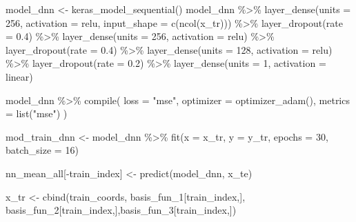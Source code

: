 \documentclass[
]{article}
\newenvironment{Shaded}{\begin{snugshade}}{\end{snugshade}}
\newcommand{\AttributeTok}[1]{\textcolor[rgb]{0.77,0.63,0.00}{#1}}
\newcommand{\DecValTok}[1]{\textcolor[rgb]{0.00,0.00,0.81}{#1}}
\newcommand{\FloatTok}[1]{\textcolor[rgb]{0.00,0.00,0.81}{#1}}
\newcommand{\FunctionTok}[1]{\textcolor[rgb]{0.00,0.00,0.00}{#1}}
\newcommand{\NormalTok}[1]{#1}
\newcommand{\OtherTok}[1]{\textcolor[rgb]{0.56,0.35,0.01}{#1}}
\newcommand{\SpecialCharTok}[1]{\textcolor[rgb]{0.00,0.00,0.00}{#1}}
\newcommand{\StringTok}[1]{\textcolor[rgb]{0.31,0.60,0.02}{#1}}
\begin{document}
\begin{Shaded}
\begin{Highlighting}[]
  
\NormalTok{model\_dnn }\OtherTok{\textless{}{-}} \FunctionTok{keras\_model\_sequential}\NormalTok{()}
\NormalTok{model\_dnn }\SpecialCharTok{\%\textgreater{}\%} 
  \FunctionTok{layer\_dense}\NormalTok{(}\AttributeTok{units =} \DecValTok{256}\NormalTok{, }\AttributeTok{activation =} \StringTok{\textquotesingle{}relu\textquotesingle{}}\NormalTok{, }\AttributeTok{input\_shape =} \FunctionTok{c}\NormalTok{(}\FunctionTok{ncol}\NormalTok{(x\_tr))) }\SpecialCharTok{\%\textgreater{}\%} 
  \FunctionTok{layer\_dropout}\NormalTok{(}\AttributeTok{rate =} \FloatTok{0.4}\NormalTok{) }\SpecialCharTok{\%\textgreater{}\%} 
  \FunctionTok{layer\_dense}\NormalTok{(}\AttributeTok{units =} \DecValTok{256}\NormalTok{, }\AttributeTok{activation =} \StringTok{\textquotesingle{}relu\textquotesingle{}}\NormalTok{) }\SpecialCharTok{\%\textgreater{}\%} 
  \FunctionTok{layer\_dropout}\NormalTok{(}\AttributeTok{rate =} \FloatTok{0.4}\NormalTok{) }\SpecialCharTok{\%\textgreater{}\%}
  \FunctionTok{layer\_dense}\NormalTok{(}\AttributeTok{units =} \DecValTok{128}\NormalTok{, }\AttributeTok{activation =} \StringTok{\textquotesingle{}relu\textquotesingle{}}\NormalTok{) }\SpecialCharTok{\%\textgreater{}\%}
  \FunctionTok{layer\_dropout}\NormalTok{(}\AttributeTok{rate =} \FloatTok{0.2}\NormalTok{) }\SpecialCharTok{\%\textgreater{}\%}
  \FunctionTok{layer\_dense}\NormalTok{(}\AttributeTok{units =} \DecValTok{1}\NormalTok{, }\AttributeTok{activation =} \StringTok{\textquotesingle{}linear\textquotesingle{}}\NormalTok{)}

\NormalTok{model\_dnn }\SpecialCharTok{\%\textgreater{}\%} \FunctionTok{compile}\NormalTok{(}
  \AttributeTok{loss =} \StringTok{"mse"}\NormalTok{,}
  \AttributeTok{optimizer =} \FunctionTok{optimizer\_adam}\NormalTok{(),}
  \AttributeTok{metrics =} \FunctionTok{list}\NormalTok{(}\StringTok{"mse"}\NormalTok{)}
\NormalTok{)}

\NormalTok{mod\_train\_dnn }\OtherTok{\textless{}{-}}\NormalTok{ model\_dnn }\SpecialCharTok{\%\textgreater{}\%}
  \FunctionTok{fit}\NormalTok{(}\AttributeTok{x =}\NormalTok{ x\_tr, }\AttributeTok{y =}\NormalTok{ y\_tr, }\AttributeTok{epochs =} \DecValTok{30}\NormalTok{, }\AttributeTok{batch\_size =} \DecValTok{16}\NormalTok{)}

  
  
\NormalTok{  nn\_mean\_all[}\SpecialCharTok{{-}}\NormalTok{train\_index] }\OtherTok{\textless{}{-}} \FunctionTok{predict}\NormalTok{(model\_dnn, x\_te)}
  
  
\NormalTok{  x\_tr }\OtherTok{\textless{}{-}} \FunctionTok{cbind}\NormalTok{(train\_coords, basis\_fun\_1[train\_index,],}
\NormalTok{                basis\_fun\_2[train\_index,],basis\_fun\_3[train\_index,])}
  

\end{Highlighting}
\end{Shaded}
\end{document}
